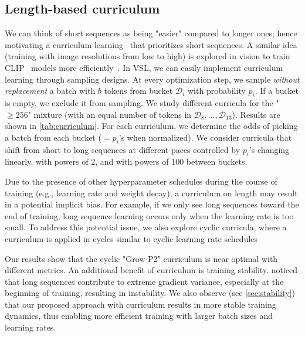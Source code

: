 \subsection{Length-based curriculum}\label{sec:curriculum}
We can think of short sequences as being "easier" compared to longer ones; hence motivating a curriculum learning~\citep{bengio2009curriculum,elman1993learning} that prioritizes short sequences. A similar idea (training with image resolutions from low to high) is explored in vision to train CLIP~\citep{radford2021learning} models more efficiently~\citep{li2024inverse}. In VSL, we can easily implement curriculum learning through sampling designs. At every optimization step, we sample \emph{without replacement} a batch with $b$ tokens from bucket $\mathcal{D}_i$ with probability $p_i$. If a bucket is empty, we exclude it from sampling. We study different curricula for the "$\ge 256$" mixture (with an equal number of tokens in $\mathcal{D}_8, \ldots, \mathcal{D}_{13}$). Results are shown in \cref{tab:curriculum}. For each curriculum, we determine the odds of picking a batch from each bucket ($=p_i$'s when normalized). 
We consider curricula that shift from short to long sequences at different paces controlled by $p_i$'s changing linearly, with powers of 2, and with powers of 100 between buckets.

Due to the presence of other hyperparameter schedules during the course of training (e.g., learning rate and weight decay), a curriculum on length may result in a potential implicit bias. For example, if we only see long sequences toward the end of training, long sequence learning occurs only when the learning rate is too small. To address this potential issue, we also explore cyclic curricula, where a curriculum is applied in cycles similar to cyclic learning rate schedules~\citep{smith2017cyclical} 


Our results show that the cyclic "Grow-P2" curriculum is near optimal with different metrics. An additional benefit of curriculum is training stability. \citet{li2022stability} noticed that long sequences contribute to extreme gradient variance, especially at the beginning of training, resulting in instability. We also observe (see \cref{sec:stability}) that our proposed approach with curriculum results in more stable training dynamics, thus enabling more efficient training with larger batch sizes and learning rates.

